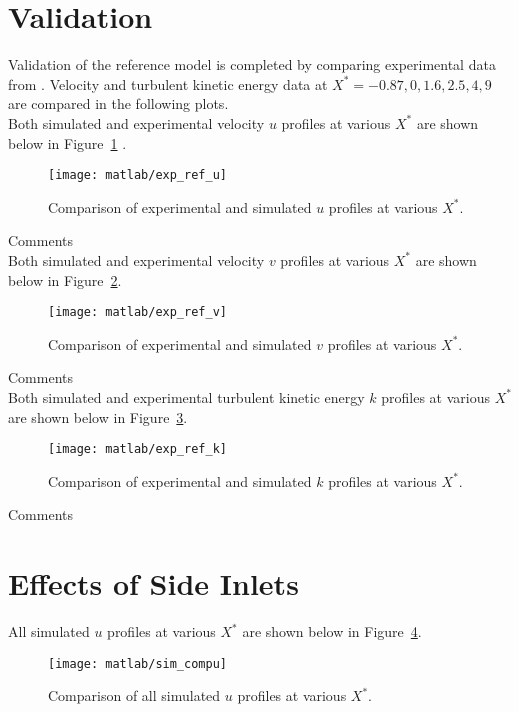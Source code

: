 \section{Validation}
\label{sec:err}
Validation of the reference model is completed by comparing experimental data from \cite{art}. Velocity and turbulent kinetic energy data at $X^*=-0.87, 0, 1.6, 2.5, 4, 9$ are compared in the following plots.\\

Both simulated and experimental velocity $u$ profiles at various $X^*$ are shown below in Figure~\ref{fig:exp_ref_u} \cite{matlab}.
\begin{figure}[H]
	\centering
	\texttt{[image: matlab/exp\_ref\_u]}
	\caption{Comparison of experimental and simulated $u$ profiles at various $X^*$.}
	\label{fig:exp_ref_u}
\end{figure}

Comments\\

Both simulated and experimental velocity $v$ profiles at various $X^*$ are shown below in Figure~\ref{fig:exp_ref_v}.
\begin{figure}[H]
	\centering
	\texttt{[image: matlab/exp\_ref\_v]}
	\caption{Comparison of experimental and simulated $v$ profiles at various $X^*$.}
	\label{fig:exp_ref_v}
\end{figure}

Comments\\

Both simulated and experimental turbulent kinetic energy $k$ profiles at various $X^*$ are shown below in Figure~\ref{fig:exp_ref_k}.
\begin{figure}[H]
	\centering
	\texttt{[image: matlab/exp\_ref\_k]}
	\caption{Comparison of experimental and simulated $k$ profiles at various $X^*$.}
	\label{fig:exp_ref_k}
\end{figure}

Comments\\

\section{Effects of Side Inlets}
\label{sec:effects_side}

All simulated $u$ profiles at various $X^*$ are shown below in Figure~\ref{fig:sim_compu}.
\begin{figure}[H]
	\centering
	\texttt{[image: matlab/sim\_compu]}
	\caption{Comparison of all simulated $u$ profiles at various $X^*$.}
	\label{fig:sim_compu}
\end{figure}


